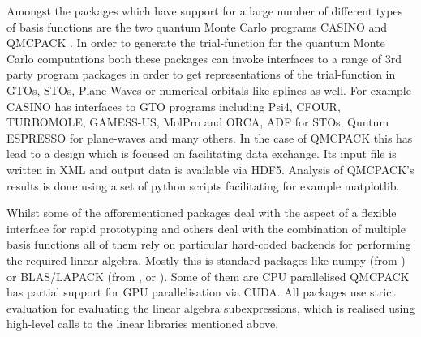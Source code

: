 Amongst the packages which have support for a large number of different types
of basis functions are the two quantum Monte Carlo programs CASINO\cite{Needs2010}
and QMCPACK .
In order to generate the trial-function for the quantum Monte Carlo
computations both these packages can invoke interfaces to a range of 3rd party
program packages
in order to get representations of the trial-function in
GTOs, STOs, Plane-Waves or numerical orbitals like splines as well.
For example CASINO\cite{Needs2010} has interfaces to
GTO programs including  Psi4, CFOUR, TURBOMOLE, GAMESS-US, MolPro and ORCA,
ADF for STOs, Quntum ESPRESSO for plane-waves
and many others.
In the case of QMCPACK  this has lead to a design
which is focused on facilitating data exchange.
Its input file is written in XML and output data is available via HDF5.
Analysis of QMCPACK's results is done using a set of python scripts
facilitating for example matplotlib.

Whilst some of the afforementioned packages
deal with the aspect of a flexible interface for rapid prototyping
and others deal with the combination of multiple basis functions
all of them rely on particular hard-coded backends for 
performing the required linear algebra.
Mostly this is standard packages like numpy
(from \python) or BLAS/LAPACK (from \cee, \fortran or \cpp).
Some of them are CPU parallelised
QMCPACK has partial support for GPU parallelisation via CUDA.
All packages use strict evaluation for evaluating the linear algebra subexpressions,
which is realised using high-level calls to the linear libraries
mentioned above.


